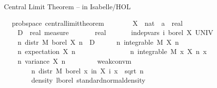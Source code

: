 \documentclass[usepdftitle=false]{beamer}
\begin{document}
\begin{frame}{Central Limit Theorem -- in Isabelle/HOL} %

\begin{isabellebody}
\isamarkupfalse%
\ {\isacharparenleft}\,\ prob{\isacharunderscore}space{\isacharparenright}\ central{\isacharunderscore}limit{\isacharunderscore}theorem{\isacharcolon}\isanewline
\ \ \ \isanewline
\ \ \ \ X\ {\isacharcolon}{\isacharcolon}\ {\isachardoublequoteopen}nat\ {\isasymRightarrow}\ {\isacharprime}a\ {\isasymRightarrow}\ real{\isachardoublequoteclose}\ \isanewline
\ \ \ \ D\ {\isacharcolon}{\isacharcolon}\ {\isachardoublequoteopen}real\ measure{\isachardoublequoteclose}\ \isanewline
\ \ \ \ {\isasymsigma}\ {\isacharcolon}{\isacharcolon}\ real\isanewline
\pause
\ \ \isanewline
\ \ \ \ {\isachardoublequoteopen}indep{\isacharunderscore}vars\ {\isacharparenleft}{\isasymlambda}i{\isachardot}\ borel{\isacharparenright}\ X\ UNIV{\isachardoublequoteclose}\ \isanewline
\ \ \ \ {\isachardoublequoteopen}{\isasymAnd}n{\isachardot}\ \alert<6>{distr}\ M\ borel\ {\isacharparenleft}X\ n{\isacharparenright}\ {\isacharequal}\ D{\isachardoublequoteclose}
\pause\ \isanewline
\ \ \ \ {\isachardoublequoteopen}{\isasymAnd}n{\isachardot}\ integrable\ M\ {\isacharparenleft}X\ n{\isacharparenright}{\isachardoublequoteclose}\ \isanewline
\ \ \ \ {\isachardoublequoteopen}{\isasymAnd}n{\isachardot}\ expectation\ {\isacharparenleft}X\ n{\isacharparenright}\ {\isacharequal}\ {}{\isachardoublequoteclose}
\pause\ \isanewline
\ \ \ \ {\isachardoublequoteopen}{\isasymsigma}\ {\isachargreater}\ {}{\isachardoublequoteclose}\ \isanewline
\ \ \ \ {\isachardoublequoteopen}{\isasymAnd}n{\isachardot}\ integrable\ M\ {\isacharparenleft}{\isasymlambda}x{\isachardot}\ {\isacharparenleft}X\ n\ x{\isacharparenright}\ \isanewline
\ \ \ \ {\isachardoublequoteopen}{\isasymAnd}n{\isachardot}\ variance\ {\isacharparenleft}X\ n{\isacharparenright}\ {\isacharequal}\ {\isasymsigma}\isanewline
\pause
\ \ \isanewline
\ \ \ \ {\isachardoublequoteopen}weak{\isacharunderscore}conv{\isacharunderscore}m\ \isanewline
\ \ \ \ \ \ \ \ {\isacharparenleft}{\isasymlambda}n{\isachardot}\ \alert<6>{distr}\ M\ \alert<6>{borel}\ {\isacharparenleft}{\isasymlambda}x{\isachardot}\ {\isasymSum}i{\isacharless}n{\isachardot}\ X\ i\ x\ {\isacharslash}\ sqrt\ {\isacharparenleft}n\ {\isacharasterisk}\ {\isasymsigma}\isanewline
\ \ \ \ \ \ \ \ {\isacharparenleft}\alert<6>{density}\ \alert<6>{lborel}\ standard{\isacharunderscore}normal{\isacharunderscore}density{\isacharparenright}{\isachardoublequoteclose}
\end{isabellebody}


\end{frame}
\end{document}
